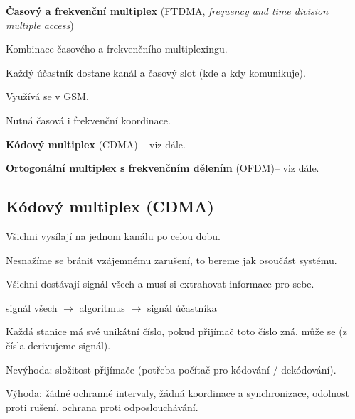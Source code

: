 \begin{compactitem}
\begin{compactenum}
        \item \textbf{Časový a frekvenční multiplex} (FTDMA, \textit{frequency and time division multiple access}) \begin{compactitem}
            \item Kombinace časového a frekvenčního multiplexingu.
            \item Každý účastník dostane kanál a časový slot (kde a kdy komunikuje).
            \item Využívá se v GSM.
            \item Nutná časová i frekvenční koordinace.
        \end{compactitem}

        \item \textbf{Kódový multiplex} (CDMA) -- viz dále.

        \item \textbf{Ortogonální multiplex s frekvenčním dělením} (OFDM)-- viz dále.
    \end{compactenum}
\end{compactitem}

\subsection{Kódový multiplex (CDMA)}

\begin{compactitem}
    \item Všichni vysílají na jednom kanálu po celou dobu. \begin{compactitem}
        \item  Nesnažíme se bránit vzájemnému zarušení, to bereme jak osoučást systému.
    \end{compactitem}

    \item Všichni dostávají signál všech a musí si extrahovat informace pro sebe. \begin{compactitem}
        \item signál všech $\rightarrow$ algoritmus $\rightarrow$ signál účastníka

        \item Každá stanice má své unikátní číslo, pokud přijímač toto číslo zná, může se  (z čísla derivujeme  signál).
    \end{compactitem}

    \item Nevýhoda: složitost přijímače (potřeba počítač pro kódování / dekódování).

    \item Výhoda: žádné ochranné intervaly, žádná koordinace a synchronizace, odolnost proti rušení, ochrana proti odposlouchávání.
\end{compactitem}

